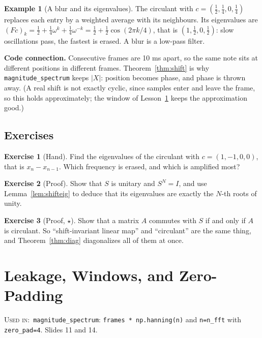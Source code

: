 \documentclass[11pt]{article}
\theoremstyle{definition}
\newtheorem{example}[theorem]{Example}
\newtheorem{innerexercise}{Exercise}[section]
\newenvironment{exercise}[1][]{\begin{innerexercise}[#1]}{\end{innerexercise}}
\newcommand{\abs}[1]{\lvert #1\rvert}
\newcommand{\code}[1]{\texttt{#1}}
\newcommand{\usedin}[1]{\par\noindent\colorbox{black!8}{\parbox{\dimexpr\linewidth-2\fboxsep\relax}{\small\textsc{Used in:}~#1}}\par\medskip}
\begin{document}
\begin{example}[A blur and its eigenvalues]
The circulant with $c=(\frac12,\frac14,0,\frac14)$ replaces each entry by a weighted
average with its neighbours. Its eigenvalues are
$(Fc)_k=\frac12+\frac14\omega^k+\frac14\omega^{-k}=\frac12+\frac12\cos(2\pi k/4)$,
that is $(1,\frac12,0,\frac12)$: slow oscillations pass, the fastest is erased. A blur
is a low-pass filter.
\end{example}

\begin{connection}
\textbf{Code connection.} Consecutive frames are 10 ms apart, so the same note sits at
different positions in different frames. Theorem~\ref{thm:shift} is why
\code{magnitude\_spectrum} keeps $\abs{X}$: position becomes phase, and phase is
thrown away. (A real shift is not exactly cyclic, since samples enter and leave the
frame, so this holds approximately; the window of Lesson~\ref{sec:window} keeps the
approximation good.)
\end{connection}

\subsection{Exercises}
\begin{exercise}[Hand]\label{ex:diff}
Find the eigenvalues of the circulant with $c=(1,-1,0,0)$, that is $x_n-x_{n-1}$.
Which frequency is erased, and which is amplified most?
\end{exercise}

\begin{exercise}[Proof]\label{ex:sunitary}
Show that $S$ is unitary and $S^N=I$, and use Lemma~\ref{lem:shifteig} to deduce that
its eigenvalues are exactly the $N$-th roots of unity.
\end{exercise}

\begin{exercise}[Proof, $\star$]\label{ex:commute}
Show that a matrix $A$ commutes with $S$ if and only if $A$ is circulant. So
``shift-invariant linear map'' and ``circulant'' are the same thing, and
Theorem~\ref{thm:diag} diagonalizes all of them at once.
\end{exercise}

\section{Leakage, Windows, and Zero-Padding}\label{sec:window}
\usedin{\code{magnitude\_spectrum}: \code{frames * np.hanning(n)} and
\code{n=n\_fft} with \code{zero\_pad=4}. Slides 11 and 14.}
\end{document}
